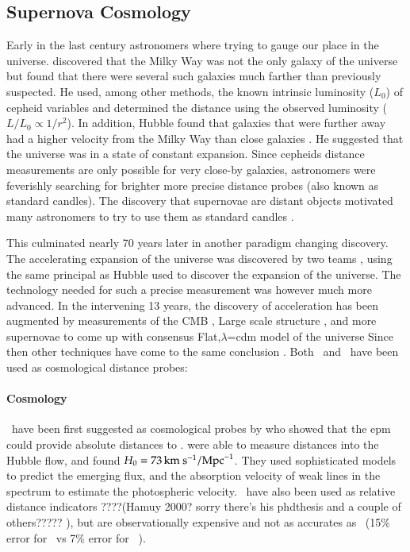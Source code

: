 \subsection{Supernova Cosmology}
Early in the last century astronomers where trying to gauge our place in the universe. \citet{1926ApJ....64..321H} discovered that the Milky Way was not the only galaxy of the universe but found that there were several such galaxies much farther than previously suspected. He used, among other methods, the known intrinsic luminosity ($L_0$) of \gls{cepheid} variables and determined the distance using the observed luminosity ($L/L_0 \propto 1/r^2$).  In addition, Hubble found that galaxies that were further away had a higher velocity from the Milky Way than close galaxies \citep{1929PNAS...15..168H}. He suggested that the universe was in a state of constant expansion. Since \glspl{cepheid} distance measurements are only possible for very close-by galaxies, astronomers were feverishly searching for brighter more precise distance probes (also known as standard candles). The discovery that supernovae are distant objects \citet{1934PNAS...20..254B} motivated many astronomers to try to use them as standard candles \citet{1938ApJ....88..285B, 1960ZA.....49..201V, 1968AJ.....73.1021K,1990A&A...230...81L, 1990AJ....100..530M}. 

This culminated nearly 70 years later in another paradigm changing discovery. The accelerating expansion of the universe was discovered by two teams \citep{1998AJ....116.1009R, 1999ApJ...517..565P}, using the same principal as Hubble used to discover the expansion of the universe. The technology needed for such a precise measurement was however much more advanced. In the intervening 13 years, the discovery of acceleration has been augmented by measurements of the CMB \cite[e.g. WMAP7;][]{2011ApJS..192...18K}, Large scale structure \citep[e.g.][]{2011MNRAS.tmp..951B}, and more supernovae \citep[e.g.]{2011A&A...525A...7A} to come up with consensus Flat,$\lambda$=\gls{cdm} model of the universe \citep[e.g.][]{2011arXiv1104.1444S}
Since then other techniques have come to the same conclusion . Both \sneia\ and \snii\ have been used as cosmological distance probes:

\paragraph{ Cosmology}
\sniip\ have been first suggested as cosmological probes by \citet{1974ApJ...193...27K} who showed that the \gls{epm} could provide absolute distances to \sneii. \cite{1994ApJ...432...42S} were able to measure \snii distances into the Hubble flow, and found $H_0 = 73\,\hbox{km s$^{-1}$} / \textrm{Mpc}^{-1}$. They used sophisticated models to predict the emerging flux, and the absorption velocity of weak lines in the spectrum to estimate the photospheric velocity.  \sniip\ have also been used as relative distance indicators ????(Hamuy 2000? sorry there's his phdthesis and a couple of others????? ), but are observationally expensive and not as accurates as \snia\ (15\% error for \snii\  vs 7\% error for \snia\ \citep{2006ApJ...645..841N}).

